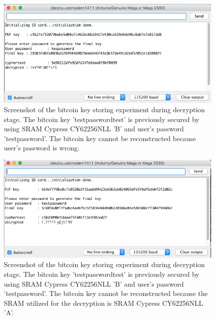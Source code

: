 \begin{figure}[tph!]
    \centerline{\includegraphics[width={\textwidth}]{images/B_decrypt_wrong_password}}
    \caption{Screenshot of the bitcoin key storing experiment during decryption stage. The bitcoin key 'testpasswordtest' is previously secured by using SRAM Cypress CY62256NLL 'B' and user's password 'testpassword'.
    The bitcoin key cannot be reconstructed because user's password is wrong.}
    \label{fig:B_decrypt_wrong_password}
\end{figure}

\begin{figure}[tph!]
    \centerline{\includegraphics[width={\textwidth}]{images/B_decrypt_wrong_SRAM_A}}
    \caption{Screenshot of the bitcoin key storing experiment during decryption stage. The bitcoin key 'testpasswordtest' is previously secured by using SRAM Cypress CY62256NLL 'B' and user's password 'testpassword'.
    The bitcoin key cannot be reconstructed because the SRAM utilized for the decryption is SRAM Cypress CY62256NLL 'A'.}
    \label{fig:B_decrypt_wrong_SRAM}
\end{figure}

